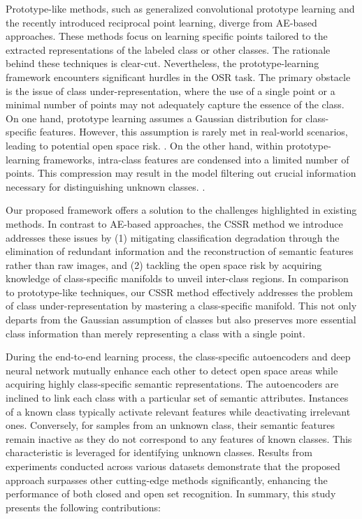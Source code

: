 \documentclass{gji}
\begin{document}
Prototype-like methods, such as generalized convolutional prototype learning and the recently introduced reciprocal point learning, diverge from AE-based approaches\cite {4}. These methods focus on learning specific points tailored to the extracted representations of the labeled class or other classes. The rationale behind these techniques is clear-cut. Nevertheless, the prototype-learning framework encounters significant hurdles in the OSR task. The primary obstacle is the issue of class under-representation, where the use of a single point or a minimal number of points may not adequately capture the essence of the class. On one hand, prototype learning assumes a Gaussian distribution for class-specific features. However, this assumption is rarely met in real-world scenarios, leading to potential open space risk. \cite {42}. On the other hand, within prototype-learning frameworks, intra-class features are condensed into a limited number of points. This compression may result in the model filtering out crucial information necessary for distinguishing unknown classes. \cite {7}.

Our proposed framework offers a solution to the challenges highlighted in existing methods. In contrast to AE-based approaches, the CSSR method we introduce addresses these issues by (1) mitigating classification degradation through the elimination of redundant information and the reconstruction of semantic features rather than raw images, and (2) tackling the open space risk by acquiring knowledge of class-specific manifolds to unveil inter-class regions. In comparison to prototype-like techniques, our CSSR method effectively addresses the problem of class under-representation by mastering a class-specific manifold. This not only departs from the Gaussian assumption of classes but also preserves more essential class information than merely representing a class with a single point.

During the end-to-end learning process, the class-specific autoencoders and deep neural network mutually enhance each other to detect open space areas while acquiring highly class-specific semantic representations. The autoencoders are inclined to link each class with a particular set of semantic attributes. Instances of a known class typically activate relevant features while deactivating irrelevant ones. Conversely, for samples from an unknown class, their semantic features remain inactive as they do not correspond to any features of known classes. This characteristic is leveraged for identifying unknown classes. Results from experiments conducted across various datasets demonstrate that the proposed approach surpasses other cutting-edge methods significantly, enhancing the performance of both closed and open set recognition. In summary, this study presents the following contributions:
\end{document}
